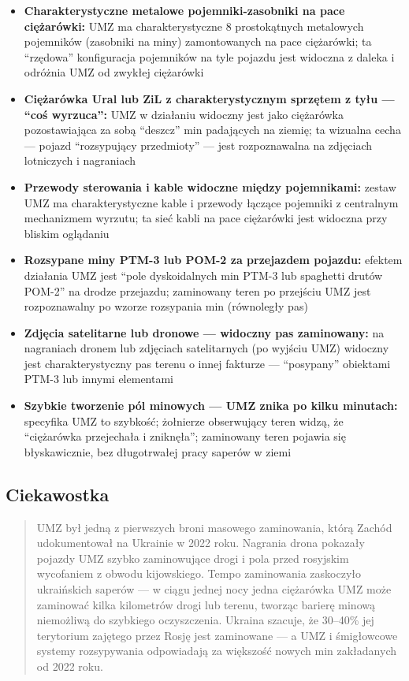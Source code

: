 \documentclass[12pt,oneside]{book}
\providecommand{\tightlist}{%
  \setlength{\itemsep}{0pt}\setlength{\parskip}{0pt}}
\begin{document}
\begin{itemize}
\tightlist
\item
  \textbf{Charakterystyczne metalowe pojemniki-zasobniki na pace
  ciężarówki:} UMZ ma charakterystyczne 8 prostokątnych metalowych
  pojemników (zasobniki na miny) zamontowanych na pace ciężarówki; ta
  ``rzędowa'' konfiguracja pojemników na tyle pojazdu jest widoczna z
  daleka i odróżnia UMZ od zwykłej ciężarówki
\item
  \textbf{Ciężarówka Ural lub ZiL z charakterystycznym sprzętem z tyłu
  --- ``coś wyrzuca'':} UMZ w działaniu widoczny jest jako ciężarówka
  pozostawiająca za sobą ``deszcz'' min padających na ziemię; ta
  wizualna cecha --- pojazd ``rozsypujący przedmioty'' --- jest
  rozpoznawalna na zdjęciach lotniczych i nagraniach
\item
  \textbf{Przewody sterowania i kable widoczne między pojemnikami:}
  zestaw UMZ ma charakterystyczne kable i przewody łączące pojemniki z
  centralnym mechanizmem wyrzutu; ta sieć kabli na pace ciężarówki jest
  widoczna przy bliskim oglądaniu
\item
  \textbf{Rozsypane miny PTM-3 lub POM-2 za przejazdem pojazdu:} efektem
  działania UMZ jest ``pole dyskoidalnych min PTM-3 lub spaghetti drutów
  POM-2'' na drodze przejazdu; zaminowany teren po przejściu UMZ jest
  rozpoznawalny po wzorze rozsypania min (równoległy pas)
\item
  \textbf{Zdjęcia satelitarne lub dronowe --- widoczny pas zaminowany:}
  na nagraniach dronem lub zdjęciach satelitarnych (po wyjściu UMZ)
  widoczny jest charakterystyczny pas terenu o innej fakturze ---
  ``posypany'' obiektami PTM-3 lub innymi elementami
\item
  \textbf{Szybkie tworzenie pól minowych --- UMZ znika po kilku
  minutach:} specyfika UMZ to szybkość; żołnierze obserwujący teren
  widzą, że ``ciężarówka przejechała i zniknęła''; zaminowany teren
  pojawia się błyskawicznie, bez długotrwałej pracy saperów w ziemi
\end{itemize}

\subsection{Ciekawostka}\label{ciekawostka-133}

\begin{quote}
UMZ był jedną z pierwszych broni masowego zaminowania, którą Zachód
udokumentował na Ukrainie w 2022 roku. Nagrania drona pokazały pojazdy
UMZ szybko zaminowujące drogi i pola przed rosyjskim wycofaniem z obwodu
kijowskiego. Tempo zaminowania zaskoczyło ukraińskich saperów --- w
ciągu jednej nocy jedna ciężarówka UMZ może zaminować kilka kilometrów
drogi lub terenu, tworząc barierę minową niemożliwą do szybkiego
oczyszczenia. Ukraina szacuje, że 30--40\% jej terytorium zajętego przez
Rosję jest zaminowane --- a UMZ i śmigłowcowe systemy rozsypywania
odpowiadają za większość nowych min zakładanych od 2022 roku.
\end{quote}
\end{document}
